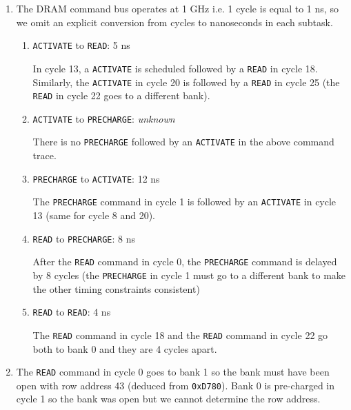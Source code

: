 \documentclass[a4paper]{article}
\begin{document}
\begin{enumerate}[label=\alph*)]
    \item The DRAM command bus operates at 1 GHz i.e. 1 cycle is equal to 1 ns,
        so we omit an explicit conversion from cycles to nanoseconds in each
        subtask.
        \begin{enumerate}[label=\roman*)]
            \item \verb|ACTIVATE| to \verb|READ|: 5 ns

                In cycle 13, a \verb|ACTIVATE| is scheduled followed by
                a \verb|READ| in cycle 18.  Similarly, the \verb|ACTIVATE| in
                cycle 20 is followed by a \verb|READ| in cycle 25 (the
                \verb|READ| in cycle 22 goes to a different bank).

            \item \verb|ACTIVATE| to \verb|PRECHARGE|: \textit{unknown}

                There is no \verb|PRECHARGE| followed by an \verb|ACTIVATE| in
                the above command trace.

            \item \verb|PRECHARGE| to \verb|ACTIVATE|: 12 ns

                The \verb|PRECHARGE| command in cycle 1 is followed by an
                \verb|ACTIVATE| in cycle 13 (same for cycle 8 and 20).

            \item \verb|READ| to \verb|PRECHARGE|: 8 ns

                After the \verb|READ| command in cycle 0, the \verb|PRECHARGE|
                command is delayed by 8 cycles (the \verb|PRECHARGE| in cycle
                1 must go to a different bank to make the other timing
                constraints consistent)

            \item \verb|READ| to \verb|READ|: 4 ns

                The \verb|READ| command in cycle 18 and the \verb|READ| command
                in cycle 22 go both to bank 0 and they are 4 cycles apart.
        \end{enumerate}
    \item The \verb|READ| command in cycle 0 goes to bank 1 so the bank must
        have been open with row address 43 (deduced from \verb|0xD780|). Bank
        0 is pre-charged in cycle 1 so the bank was open but we cannot determine
          the row address.


\end{enumerate}
\end{document}
